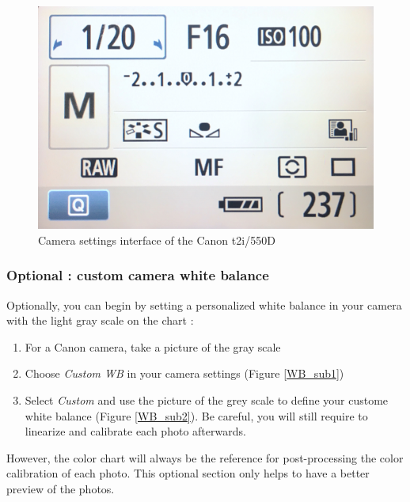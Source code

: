 \documentclass[10pt,letter,english]{article}
\begin{document}
\begin{figure}[H]
    \centering
    \includegraphics[width=0.5\linewidth]{Figures/camera_settings.JPG}
    \caption{Camera settings interface of the Canon t2i/550D}
    \label{fig:my_label}
\end{figure}




\subsubsection{Optional : custom camera white balance}
Optionally, you can begin by setting a personalized white balance in your camera with the light gray scale on the chart :
\begin{enumerate}
    \item For a Canon camera, take a picture of the gray scale
    \item Choose \textit{Custom WB} in your camera settings (Figure \ref{WB_sub1})
    \item Select \textit{Custom} and use the picture of the grey scale to define your custome white balance (Figure \ref{WB_sub2}).  Be careful, you will still require to linearize and calibrate each photo afterwards.
\end{enumerate}

However, the color chart will always be the reference for post-processing the color calibration of each photo. This optional section only helps to have a better preview of the photos.
\end{document}
